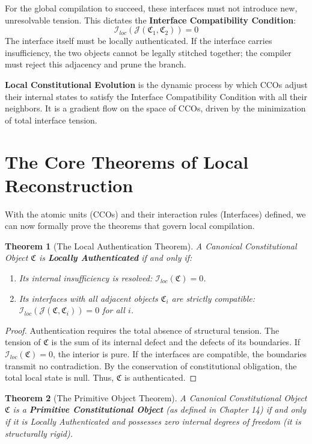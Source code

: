 \documentclass[12pt,openany]{extbook}
\theoremstyle{plain}
\newtheorem{theorem}{Theorem}[chapter]
\theoremstyle{definition}
\begin{document}
For the global compilation to succeed, these interfaces must not introduce new, unresolvable tension. This dictates the \textbf{Interface Compatibility Condition}:
\[
\mathcal{I}_{loc}(\mathcal{J}(\mathfrak{C}_1, \mathfrak{C}_2)) = 0
\]
The interface itself must be locally authenticated. If the interface carries insufficiency, the two objects cannot be legally stitched together; the compiler must reject this adjacency and prune the branch.

\textbf{Local Constitutional Evolution} is the dynamic process by which CCOs adjust their internal states to satisfy the Interface Compatibility Condition with all their neighbors. It is a gradient flow on the space of CCOs, driven by the minimization of total interface tension.

\section{The Core Theorems of Local Reconstruction}

With the atomic units (CCOs) and their interaction rules (Interfaces) defined, we can now formally prove the theorems that govern local compilation.

\begin{theorem}[The Local Authentication Theorem]
A Canonical Constitutional Object $\mathfrak{C}$ is \textbf{Locally Authenticated} if and only if:
\begin{enumerate}
    \item Its internal insufficiency is resolved: $\mathcal{I}_{loc}(\mathfrak{C}) = 0$.
    \item Its interfaces with all adjacent objects $\mathfrak{C}_i$ are strictly compatible: $\mathcal{I}_{loc}(\mathcal{J}(\mathfrak{C}, \mathfrak{C}_i)) = 0$ for all $i$.
\end{enumerate}
\end{theorem}

\begin{proof}
Authentication requires the total absence of structural tension. The tension of $\mathfrak{C}$ is the sum of its internal defect and the defects of its boundaries. If $\mathcal{I}_{loc}(\mathfrak{C}) = 0$, the interior is pure. If the interfaces are compatible, the boundaries transmit no contradiction. By the conservation of constitutional obligation, the total local state is null. Thus, $\mathfrak{C}$ is authenticated.
\end{proof}

\begin{theorem}[The Primitive Object Theorem]
A Canonical Constitutional Object $\mathfrak{C}$ is a \textbf{Primitive Constitutional Object} (as defined in Chapter 14) if and only if it is Locally Authenticated and possesses zero internal degrees of freedom (it is structurally rigid).
\end{theorem}
\end{document}
